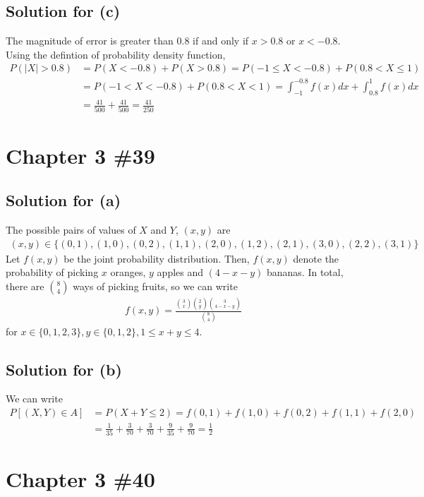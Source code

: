 \documentclass{scrartcl}
\begin{document}
\subsection{Solution for (c)}
The magnitude of error is greater than 0.8 if and only if \(x > 0.8\) or \(x <
-0.8\). Using the defintion of probability density function,
\begin{align*}
  P(|X| > 0.8)
  &= P(X < -0.8) + P(X > 0.8)
  = P(-1 \leq X < -0.8) + P(0.8 < X \leq 1) \\
  &= P(-1 < X < -0.8) + P(0.8 < X < 1)
  = \int^{-0.8}_{-1} f(x) dx + \int^{1}_{0.8} f(x) dx \\
  &= \frac{41}{500} + \frac{41}{500} = \frac{41}{250}
\end{align*}

\section{Chapter 3 \#39}
\subsection{Solution for (a)}
The possible pairs of values of \(X\) and \(Y\), \((x, y)\) are
\begin{align*}
  (x, y) \in \{(0, 1), (1, 0), (0, 2), (1, 1), (2, 0), (1, 2), (2, 1), (3, 0),
  (2, 2), (3, 1)\}
\end{align*}
Let \(f(x, y)\) be the joint probability distribution. Then, \(f(x, y)\) denote
the probability of picking \(x\) oranges, \(y\) apples and \((4 - x - y)\)
bananas. In total, there are \(8 \choose 4\) ways of picking fruits, so we can
write
\begin{align*}
  f(x, y)
  = \frac{{3 \choose x} {2 \choose y} {3 \choose {4 - x - y}}}{{8 \choose 4}}
\end{align*}
for \(x \in \{0, 1, 2, 3\}, y \in \{0, 1, 2\}, 1 \leq x + y \leq 4\).

\subsection{Solution for (b)}
We can write
\begin{align*}
  P[(X, Y) \in A]
  &= P(X + Y \leq 2)
  = f(0, 1) + f(1, 0) + f(0, 2) + f(1, 1) + f(2, 0) \\
  &= \frac{1}{35} + \frac{3}{70} + \frac{3}{70} + \frac{9}{35} + \frac{9}{70}
  = \frac{1}{2}
\end{align*}

\section{Chapter 3 \#40}
\end{document}
